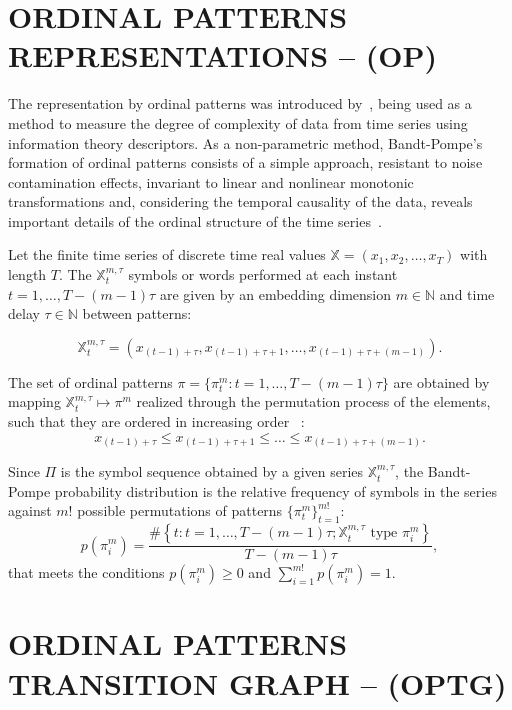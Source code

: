 \documentclass{isprs}
\begin{document}
	\section{ORDINAL PATTERNS REPRESENTATIONS -- (OP)}\label{OP}
	
	The representation by ordinal patterns was introduced by~\cite{Bandt2002Permutation}, being used as a method to measure the degree of complexity of data from time series using information theory descriptors.
	As a non-parametric method, Bandt-Pompe's formation of ordinal patterns consists of a simple approach, resistant to noise contamination effects, invariant to linear and nonlinear monotonic transformations and, considering the temporal causality of the data, reveals important details of the ordinal structure of the time series~\citep{Larrondo2006Random}.
	
	Let the finite time series of discrete time real values $\mathbb{X} = (x_1, x_2, \dots, x_T)$ with length $T$.
	The $\mathbb{X}_t^{m, \tau} $ symbols or words performed at each instant $t = 1, \dots, T- (m-1) \tau$ are given by an embedding dimension $m \in \mathbb{N}$ and time delay $\tau \in \mathbb{N}$ between patterns:
	
	\begin{equation}
	\mathbb{X}_t^{m,\tau} = (x_{(t-1)+\tau}, x_{(t-1)+\tau+1},\ldots, x_{(t-1)+\tau+(m-1)}).
	\end{equation}
	
	The set of ordinal patterns $\pi = \{\pi_t^m: t = 1, \dots, T- (m-1) \tau \}$ are obtained by mapping $\mathbb{X}^{m, \tau}_t \mapsto \pi^m$ realized through the permutation process of the elements, such that they are ordered in increasing order ~\citep{Ravetti2014noise}:
	$$x_{(t-1) + \tau} \leq x_{(t-1) + \tau + 1} \leq \dots \leq x_{(t-1) + \tau + (m-1)}.$$
	
	Since $\Pi$ is the symbol sequence obtained by a given series $\mathbb{X}_t^{m,\tau}$, the Bandt-Pompe probability distribution is the relative frequency of symbols in the series against $m!$ possible permutations of patterns $\{\pi_t^m \}_{t = 1}^{m!}$:
	\begin{equation}
	p(\pi_i^m) = \frac{\#\left \{t : t = 1, \dots, T-(m-1)\tau; \mathbb{X}_t^{m,\tau} \text{ type } \pi_i^m\right \}}{T- (m-1)\tau},  
	\end{equation}
	that meets the conditions $p(\pi_i^m) \ge 0$ and  $\sum_{i=1}^{m!} p(\pi_i^m) = 1$.
	
	\section{ORDINAL PATTERNS TRANSITION GRAPH -- (OPTG)}\label{OPTG}
	
\end{document}
